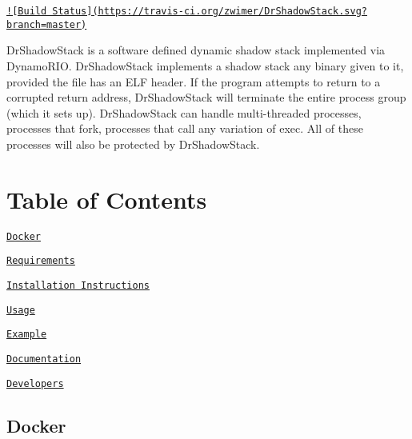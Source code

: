 \href{https://travis-ci.org/zwimer/DrShadowStack}{\tt !\mbox{[}Build Status\mbox{]}(https\-://travis-\/ci.\-org/zwimer/\-Dr\-Shadow\-Stack.\-svg?branch=master)}

Dr\-Shadow\-Stack is a software defined dynamic shadow stack implemented via Dynamo\-R\-I\-O. Dr\-Shadow\-Stack implements a shadow stack any binary given to it, provided the file has an E\-L\-F header. If the program attempts to return to a corrupted return address, Dr\-Shadow\-Stack will terminate the entire process group (which it sets up). Dr\-Shadow\-Stack can handle multi-\/threaded processes, processes that fork, processes that call any variation of exec. All of these processes will also be protected by Dr\-Shadow\-Stack.

\section*{Table of Contents}


\begin{DoxyEnumerate}
\item \href{#docker}{\tt Docker}
\end{DoxyEnumerate}
\begin{DoxyEnumerate}
\item \href{#requirements}{\tt Requirements}
\end{DoxyEnumerate}
\begin{DoxyEnumerate}
\item \href{#installation-instructions}{\tt Installation Instructions}
\end{DoxyEnumerate}
\begin{DoxyEnumerate}
\item \href{#usage}{\tt Usage}
\end{DoxyEnumerate}
\begin{DoxyEnumerate}
\item \href{#example}{\tt Example}
\end{DoxyEnumerate}
\begin{DoxyEnumerate}
\item \href{#documentation}{\tt Documentation}
\end{DoxyEnumerate}
\begin{DoxyEnumerate}
\item \href{#developers}{\tt Developers}
\end{DoxyEnumerate}

\subsection*{Docker}

